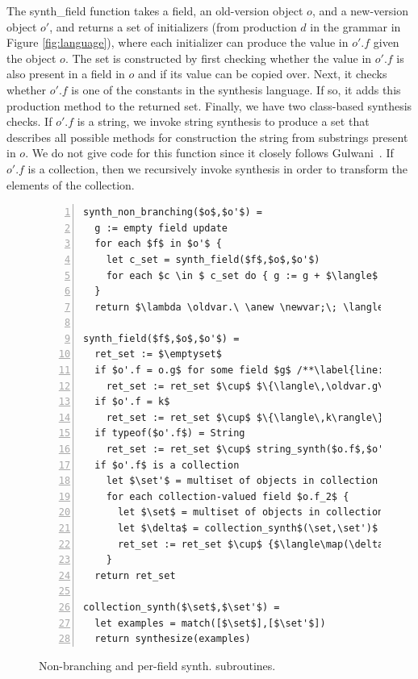 \documentclass[natbib,10pt]{sigplanconf}
\begin{document}
The \textsf{synth\_field} function takes a field, an old-version
object $o$, and a new-version object $o'$, and returns a set of initializers
(from production $d$ in the grammar in Figure \ref{fig:language}), where
each initializer can produce the value in $o'.f$ given the object $o$.
The set is constructed by first checking whether the value in $o'.f$
is also present in a field in $o$ and if its value can be copied over.
Next, it checks whether $o'.f$ is one of the constants in the synthesis language.
If so, it adds this production method to the returned set.
Finally, we have two class-based synthesis checks.  If $o'.f$ is a string,
we invoke string synthesis to produce a set that describes all possible
methods for construction the string from substrings present in $o$.
We do not give code for this function since it closely follows
Gulwani~\cite{Gulwani:popl:2011}.  If $o'.f$ is a collection, then we 
recursively invoke synthesis in order to transform the elements of the
collection.

\begin{figure}
\hspace*{.2in}
\begin{minipage}{4.3in}
\begin{lstlisting}[numbers=left]
synth_non_branching($o$,$o'$) =
  g := empty field update
  for each $f$ in $o'$ {
    let c_set = synth_field($f$,$o$,$o'$)
    for each $c \in $ c_set do { g := g + $\langle$ ; $\newvar.f$ := $c$ $\rangle$ }
  }
  return $\lambda \oldvar.\ \anew \newvar;\; \langle \text{g} \rangle; \return\ \newvar$

synth_field($f$,$o$,$o'$) =
  ret_set := $\emptyset$
  if $o'.f = o.g$ for some field $g$ /**\label{line:path2}*/
    ret_set := ret_set $\cup$ $\{\langle\,\oldvar.g\rangle\}$
  if $o'.f = k$
    ret_set := ret_set $\cup$ $\{\langle\,k\rangle\}$
  if typeof($o'.f$) = String
    ret_set := ret_set $\cup$ string_synth($o.f$,$o'.f$)
  if $o'.f$ is a collection
    let $\set'$ = multiset of objects in collection $o'.f$
    for each collection-valued field $o.f_2$ {
      let $\set$ = multiset of objects in collection $o.f_2$
      let $\delta$ = collection_synth$(\set,\set')$
      ret_set := ret_set $\cup$ {$\langle\map(\delta, o.f_2)\rangle$}
    }
  return ret_set

collection_synth($\set$,$\set'$) =
  let examples = match([$\set$],[$\set'$])
  return synthesize(examples)
\end{lstlisting}
\end{minipage}
\caption{Non-branching and per-field synth. subroutines.\label{fig:non-branch-synthesis}}
\end{figure}
\end{document}
